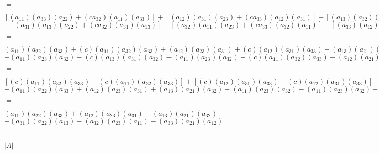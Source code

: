 \documentclass{report}
\begin{document}
\begin{center}
$=$
\end{center}
\begin{center}
$
[(a_{11})(a_{33})(a_{22})+(ca_{32})(a_{11})(a_{33})]
+[(a_{12})(a_{31})(a_{23})+(ca_{33})(a_{12})(a_{31})]
+[(a_{13})(a_{32})(a_{21})+(ca_{31})(a_{13})(a_{32})]
$
\\
$
-[(a_{31})(a_{13})(a_{22})+(ca_{32})(a_{31})(a_{13})]
-[(a_{32})(a_{11})(a_{23})+(ca_{33})(a_{32})(a_{11})]
-[(a_{33})(a_{12})(a_{21})+(ca_{31})(a_{33})(a_{12})]
$
\end{center}
\begin{center}
$=$
\end{center}
\begin{center}
$
(a_{11})(a_{22})(a_{33})+(c)(a_{11})(a_{32})(a_{33})
+(a_{12})(a_{23})(a_{31})+(c)(a_{12})(a_{31})(a_{33})
+(a_{13})(a_{21})(a_{32})+(c)(a_{13})(a_{31})(a_{32})
$
\\
$
-(a_{11})(a_{23})(a_{32})-(c)(a_{13})(a_{31})(a_{32})
-(a_{11})(a_{23})(a_{32})-(c)(a_{11})(a_{32})(a_{33})
-(a_{12})(a_{21})(a_{33})-(c)(a_{12})(a_{31})(a_{33})
$
\end{center}
\begin{center}
$=$
\end{center}
\begin{center}
$
[(c)(a_{11})(a_{32})(a_{33})-(c)(a_{11})(a_{32})(a_{33})]
+[(c)(a_{12})(a_{31})(a_{33})-(c)(a_{12})(a_{31})(a_{33})]
+[(c)(a_{13})(a_{31})(a_{32})-(c)(a_{13})(a_{31})(a_{32})]
$
\\
$
+(a_{11})(a_{22})(a_{33})+(a_{12})(a_{23})(a_{31})+(a_{13})(a_{21})(a_{32})
-(a_{11})(a_{23})(a_{32})-(a_{11})(a_{23})(a_{32})-(a_{12})(a_{21})(a_{33})
$
\end{center}
\begin{center}
$=$
\end{center}
\begin{center}
$
	(a_{11})(a_{22})(a_{33})+(a_{12})(a_{23})(a_{31})+(a_{13})(a_{21})(a_{32})	
$
\\
$
	-(a_{31})(a_{22})(a_{13})-(a_{32})(a_{23})(a_{11})-(a_{33})(a_{21})(a_{12})
$
\end{center}
\begin{center}
$=$
\end{center}
\begin{center}
$
|A|
$
\end{center}



\pagebreak
\end{document}
